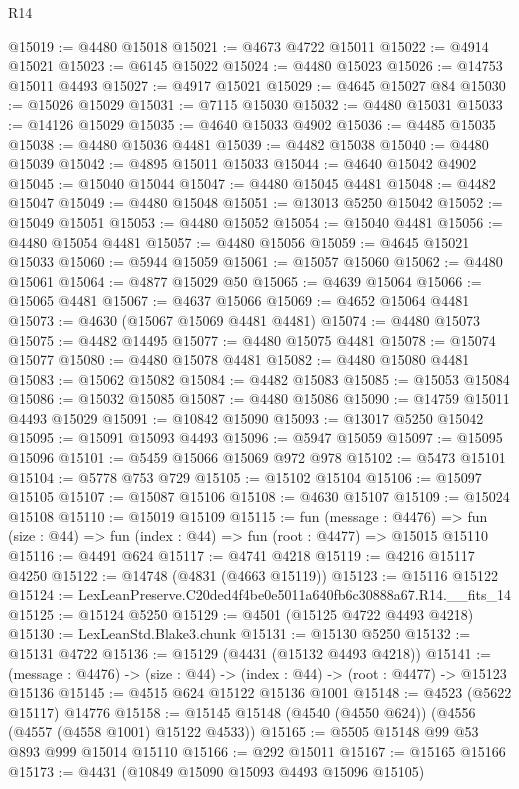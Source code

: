 \begin{lexlean}{R14}
\begin{coremodule}
@15019 := @4480 @15018
@15021 := @4673 @4722 @15011
@15022 := @4914 @15021
@15023 := @6145 @15022
@15024 := @4480 @15023
@15026 := @14753 @15011 @4493
@15027 := @4917 @15021
@15029 := @4645 @15027 @84
@15030 := @15026 @15029
@15031 := @7115 @15030
@15032 := @4480 @15031
@15033 := @14126 @15029
@15035 := @4640 @15033 @4902
@15036 := @4485 @15035
@15038 := @4480 @15036 @4481
@15039 := @4482 @15038
@15040 := @4480 @15039
@15042 := @4895 @15011 @15033
@15044 := @4640 @15042 @4902
@15045 := @15040 @15044
@15047 := @4480 @15045 @4481
@15048 := @4482 @15047
@15049 := @4480 @15048
@15051 := @13013 @5250 @15042
@15052 := @15049 @15051
@15053 := @4480 @15052
@15054 := @15040 @4481
@15056 := @4480 @15054 @4481
@15057 := @4480 @15056
@15059 := @4645 @15021 @15033
@15060 := @5944 @15059
@15061 := @15057 @15060
@15062 := @4480 @15061
@15064 := @4877 @15029 @50
@15065 := @4639 @15064
@15066 := @15065 @4481
@15067 := @4637 @15066
@15069 := @4652 @15064 @4481
@15073 := @4630 (@15067 @15069 @4481 @4481)
@15074 := @4480 @15073
@15075 := @4482 @14495
@15077 := @4480 @15075 @4481
@15078 := @15074 @15077
@15080 := @4480 @15078 @4481
@15082 := @4480 @15080 @4481
@15083 := @15062 @15082
@15084 := @4482 @15083
@15085 := @15053 @15084
@15086 := @15032 @15085
@15087 := @4480 @15086
@15090 := @14759 @15011 @4493 @15029
@15091 := @10842 @15090
@15093 := @13017 @5250 @15042
@15095 := @15091 @15093 @4493
@15096 := @5947 @15059
@15097 := @15095 @15096
@15101 := @5459 @15066 @15069 @972 @978
@15102 := @5473 @15101
@15104 := @5778 @753 @729
@15105 := @15102 @15104
@15106 := @15097 @15105
@15107 := @15087 @15106
@15108 := @4630 @15107
@15109 := @15024 @15108
@15110 := @15019 @15109
@15115 := fun (message : @4476) =>
  fun (size : @44) => fun (index : @44) => fun (root : @4477) => @15015 @15110
@15116 := @4491 @624
@15117 := @4741 @4218
@15119 := @4216 @15117 @4250
@15122 := @14748 (@4831 (@4663 @15119))
@15123 := @15116 @15122
@15124 := LexLeanPreserve.C20ded4f4be0e5011a640fb6c30888a67.R14.__fits_14
@15125 := @15124 @5250
@15129 := @4501 (@15125 @4722 @4493 @4218)
@15130 := LexLeanStd.Blake3.chunk
@15131 := @15130 @5250
@15132 := @15131 @4722
@15136 := @15129 (@4431 (@15132 @4493 @4218))
@15141 := (message : @4476) -> (size : @44) -> (index : @44) -> (root : @4477) -> @15123 @15136
@15145 := @4515 @624 @15122 @15136 @1001
@15148 := @4523 (@5622 @15117) @14776
@15158 := @15145 @15148 (@4540 (@4550 @624)) (@4556 (@4557 (@4558 @1001) @15122 @4533))
@15165 := @5505 @15148 @99 @53 @893 @999 @15014 @15110
@15166 := @292 @15011
@15167 := @15165 @15166
@15173 := @4431 (@10849 @15090 @15093 @4493 @15096 @15105)

\end{coremodule}
\end{lexlean}
